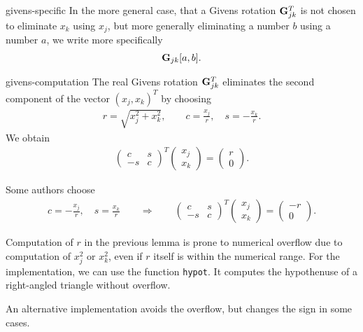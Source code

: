 \begin{Notation}{givens-specific}
  In the more general case, that a Givens rotation $\mathbf G_{jk}^T$ is
  not chosen to eliminate $x_k$ using $x_j$, but more generally
  eliminating a number $b$ using a number $a$, we write more
  specifically
  \begin{gather}
    \mathbf G_{jk}[a,b].
  \end{gather}
\end{Notation}

\begin{Lemma}{givens-computation}
  The real Givens rotation $\mathbf G_{jk}^T$ eliminates the second
  component of the vector $(x_j,x_k)^T$ by choosing
  \begin{gather}
    r = \sqrt{x_j^2+x_k^2},\qquad
    c = \frac{x_j}r,\quad s = -\frac{x_k}r.
  \end{gather}
  We obtain
  \begin{gather}
    \begin{pmatrix}
      c & s \\ -s & c
    \end{pmatrix}^T
    \begin{pmatrix}
      x_j\\x_k
    \end{pmatrix}
    =
    \begin{pmatrix}
      r\\0
    \end{pmatrix}
    .
  \end{gather}
\end{Lemma}
\begin{remark}
  Some authors choose
  \begin{gather}
    c = -\frac{x_j}r,\quad s = \frac{x_k}r
    \qquad \Rightarrow \qquad
    \begin{pmatrix}
      c & s \\ -s & c
    \end{pmatrix}^T
    \begin{pmatrix}
      x_j\\x_k
    \end{pmatrix}
    =
    \begin{pmatrix}
      -r\\0
    \end{pmatrix}
    .
  \end{gather}
\end{remark}

\begin{remark}
  Computation of $r$ in the previous lemma is prone to numerical
  overflow due to computation of $x_j^2$ or $x_k^2$, even if $r$
  itself is within the numerical range. For the implementation, we can
  use the function \lstinline!hypot!. It computes the hypothenuse of a
  right-angled triangle without overflow.

  An alternative implementation avoids the overflow, but changes the
  sign in some cases.
\end{remark}

